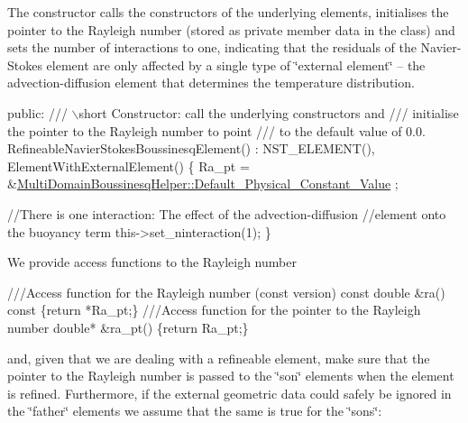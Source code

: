 The constructor calls the constructors of the underlying elements, initialises the pointer to the Rayleigh number (stored as private member data in the class) and sets the number of interactions to one, indicating that the residuals of the Navier-\/\+Stokes element are only affected by a single type of \char`\"{}external element\char`\"{} -- the advection-\/diffusion element that determines the temperature distribution.


\begin{DoxyCodeInclude}
 
  \textcolor{keyword}{public}: 
 \textcolor{comment}{}
\textcolor{comment}{ /// \(\backslash\)short Constructor: call the underlying constructors and }
\textcolor{comment}{ /// initialise the pointer to the Rayleigh number to point}
\textcolor{comment}{ /// to the default value of 0.0.}
\textcolor{comment}{} RefineableNavierStokesBoussinesqElement() : 
  NST\_ELEMENT(), ElementWithExternalElement()
  \{
   Ra\_pt = &\hyperlink{namespaceoomph_1_1MultiDomainBoussinesqHelper_ae77c07b69cffe295ac07e2c25c31a8aa}{MultiDomainBoussinesqHelper::Default\_Physical\_Constant\_Value}
      ;
   
   \textcolor{comment}{//There is one interaction: The effect of the advection-diffusion}
   \textcolor{comment}{//element onto the buoyancy term}
   this->set\_ninteraction(1);
  \} 

\end{DoxyCodeInclude}


We provide access functions to the Rayleigh number


\begin{DoxyCodeInclude}
  \textcolor{comment}{}
\textcolor{comment}{  ///Access function for the Rayleigh number (const version)}
\textcolor{comment}{}  \textcolor{keyword}{const} \textcolor{keywordtype}{double} &ra()\textcolor{keyword}{ const }\{\textcolor{keywordflow}{return} *Ra\_pt;\}
  \textcolor{comment}{}
\textcolor{comment}{  ///Access function for the pointer to the Rayleigh number}
\textcolor{comment}{}  \textcolor{keywordtype}{double}* &ra\_pt() \{\textcolor{keywordflow}{return} Ra\_pt;\}

\end{DoxyCodeInclude}


and, given that we are dealing with a refineable element, make sure that the pointer to the Rayleigh number is passed to the \char`\"{}son\char`\"{} elements when the element is refined. Furthermore, if the external geometric data could safely be ignored in the \char`\"{}father\char`\"{} elements we assume that the same is true for the \char`\"{}sons\char`\"{}\+:


